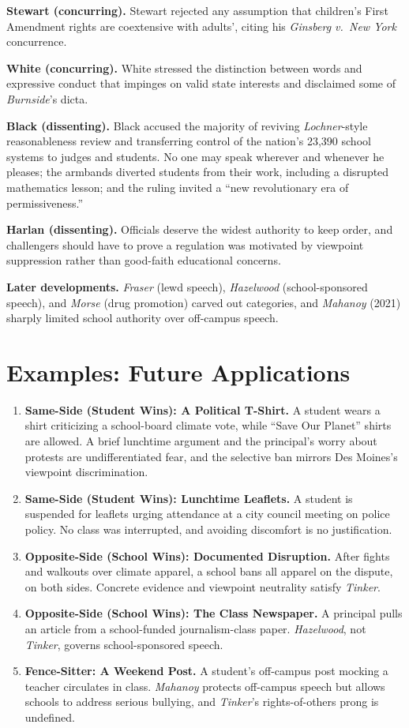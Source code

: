 \documentclass[12pt]{article}
\begin{document}
\textbf{Stewart (concurring).} Stewart rejected any assumption that children's First Amendment rights are coextensive with adults', citing his \textit{Ginsberg v.\ New York} concurrence.

\textbf{White (concurring).} White stressed the distinction between words and expressive conduct that impinges on valid state interests and disclaimed some of \textit{Burnside}'s dicta.

\textbf{Black (dissenting).} Black accused the majority of reviving \textit{Lochner}-style reasonableness review and transferring control of the nation's 23,390 school systems to judges and students. No one may speak wherever and whenever he pleases; the armbands diverted students from their work, including a disrupted mathematics lesson; and the ruling invited a ``new revolutionary era of permissiveness.''

\textbf{Harlan (dissenting).} Officials deserve the widest authority to keep order, and challengers should have to prove a regulation was motivated by viewpoint suppression rather than good-faith educational concerns.

\textbf{Later developments.} \textit{Fraser} (lewd speech), \textit{Hazelwood} (school-sponsored speech), and \textit{Morse} (drug promotion) carved out categories, and \textit{Mahanoy} (2021) sharply limited school authority over off-campus speech.

\section{Examples: Future Applications}

\begin{enumerate}
\item \textbf{Same-Side (Student Wins): A Political T-Shirt.} A student wears a shirt criticizing a school-board climate vote, while ``Save Our Planet'' shirts are allowed. A brief lunchtime argument and the principal's worry about protests are undifferentiated fear, and the selective ban mirrors Des Moines's viewpoint discrimination.
\item \textbf{Same-Side (Student Wins): Lunchtime Leaflets.} A student is suspended for leaflets urging attendance at a city council meeting on police policy. No class was interrupted, and avoiding discomfort is no justification.
\item \textbf{Opposite-Side (School Wins): Documented Disruption.} After fights and walkouts over climate apparel, a school bans all apparel on the dispute, on both sides. Concrete evidence and viewpoint neutrality satisfy \textit{Tinker}.
\item \textbf{Opposite-Side (School Wins): The Class Newspaper.} A principal pulls an article from a school-funded journalism-class paper. \textit{Hazelwood}, not \textit{Tinker}, governs school-sponsored speech.
\item \textbf{Fence-Sitter: A Weekend Post.} A student's off-campus post mocking a teacher circulates in class. \textit{Mahanoy} protects off-campus speech but allows schools to address serious bullying, and \textit{Tinker}'s rights-of-others prong is undefined.
\end{enumerate}
\end{document}
